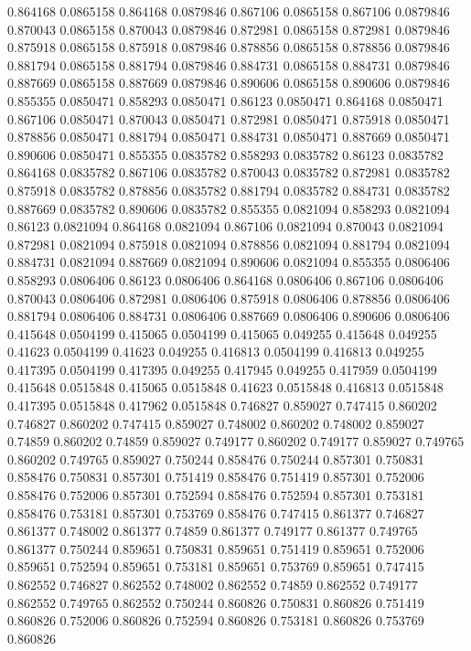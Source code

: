 0.864168 0.0865158
0.864168 0.0879846
0.867106 0.0865158
0.867106 0.0879846
0.870043 0.0865158
0.870043 0.0879846
0.872981 0.0865158
0.872981 0.0879846
0.875918 0.0865158
0.875918 0.0879846
0.878856 0.0865158
0.878856 0.0879846
0.881794 0.0865158
0.881794 0.0879846
0.884731 0.0865158
0.884731 0.0879846
0.887669 0.0865158
0.887669 0.0879846
0.890606 0.0865158
0.890606 0.0879846
0.855355 0.0850471
0.858293 0.0850471
0.86123 0.0850471
0.864168 0.0850471
0.867106 0.0850471
0.870043 0.0850471
0.872981 0.0850471
0.875918 0.0850471
0.878856 0.0850471
0.881794 0.0850471
0.884731 0.0850471
0.887669 0.0850471
0.890606 0.0850471
0.855355 0.0835782
0.858293 0.0835782
0.86123 0.0835782
0.864168 0.0835782
0.867106 0.0835782
0.870043 0.0835782
0.872981 0.0835782
0.875918 0.0835782
0.878856 0.0835782
0.881794 0.0835782
0.884731 0.0835782
0.887669 0.0835782
0.890606 0.0835782
0.855355 0.0821094
0.858293 0.0821094
0.86123 0.0821094
0.864168 0.0821094
0.867106 0.0821094
0.870043 0.0821094
0.872981 0.0821094
0.875918 0.0821094
0.878856 0.0821094
0.881794 0.0821094
0.884731 0.0821094
0.887669 0.0821094
0.890606 0.0821094
0.855355 0.0806406
0.858293 0.0806406
0.86123 0.0806406
0.864168 0.0806406
0.867106 0.0806406
0.870043 0.0806406
0.872981 0.0806406
0.875918 0.0806406
0.878856 0.0806406
0.881794 0.0806406
0.884731 0.0806406
0.887669 0.0806406
0.890606 0.0806406
0.415648 0.0504199
0.415065 0.0504199
0.415065 0.049255
0.415648 0.049255
0.41623 0.0504199
0.41623 0.049255
0.416813 0.0504199
0.416813 0.049255
0.417395 0.0504199
0.417395 0.049255
0.417945 0.049255
0.417959 0.0504199
0.415648 0.0515848
0.415065 0.0515848
0.41623 0.0515848
0.416813 0.0515848
0.417395 0.0515848
0.417962 0.0515848
0.746827 0.859027
0.747415 0.860202
0.746827 0.860202
0.747415 0.859027
0.748002 0.860202
0.748002 0.859027
0.74859 0.860202
0.74859 0.859027
0.749177 0.860202
0.749177 0.859027
0.749765 0.860202
0.749765 0.859027
0.750244 0.858476
0.750244 0.857301
0.750831 0.858476
0.750831 0.857301
0.751419 0.858476
0.751419 0.857301
0.752006 0.858476
0.752006 0.857301
0.752594 0.858476
0.752594 0.857301
0.753181 0.858476
0.753181 0.857301
0.753769 0.858476
0.747415 0.861377
0.746827 0.861377
0.748002 0.861377
0.74859 0.861377
0.749177 0.861377
0.749765 0.861377
0.750244 0.859651
0.750831 0.859651
0.751419 0.859651
0.752006 0.859651
0.752594 0.859651
0.753181 0.859651
0.753769 0.859651
0.747415 0.862552
0.746827 0.862552
0.748002 0.862552
0.74859 0.862552
0.749177 0.862552
0.749765 0.862552
0.750244 0.860826
0.750831 0.860826
0.751419 0.860826
0.752006 0.860826
0.752594 0.860826
0.753181 0.860826
0.753769 0.860826
